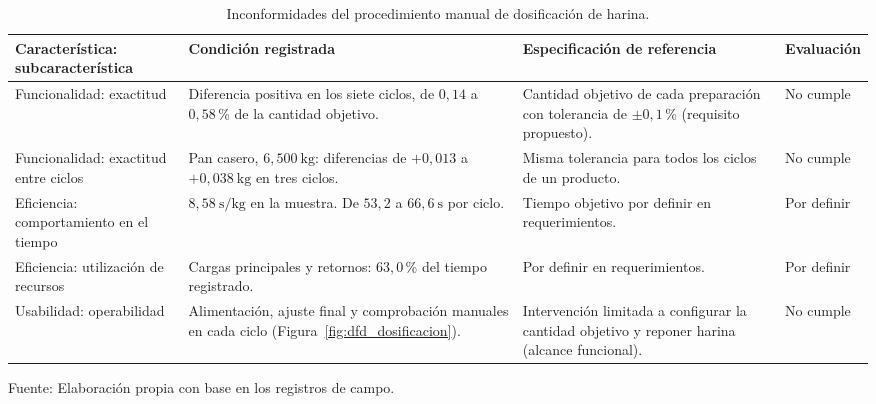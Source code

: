 \begin{table}[H]
    \centering
    \caption{Inconformidades del procedimiento manual de dosificación de
    harina.}
    \label{tab:inconformidades}
    \footnotesize
    \setlength{\tabcolsep}{4pt}
    \renewcommand{\arraystretch}{1.35}

    \begin{tabularx}{\textwidth}{
        >{\raggedright\arraybackslash}p{}
        >{\raggedright\arraybackslash}X
        >{\raggedright\arraybackslash}p{}
        >{\raggedright\arraybackslash}p{}}
        \toprule[1pt]
        \textbf{Característica: subcaracterística} &
        \textbf{Condición registrada} &
        \textbf{Especificación de referencia} &
        \textbf{Evaluación} \\
        \midrule[1pt]

        Funcionalidad: exactitud &
        Diferencia positiva en los siete ciclos, de $0{,}14$ a
        $0{,}58$\,\% de la cantidad objetivo. &
        Cantidad objetivo de cada preparación con tolerancia de
        $\pm 0{,}1$\,\% (requisito propuesto). &
        No cumple \\
        \midrule

        Funcionalidad: exactitud entre ciclos &
        Pan casero, $6{,}500\ \mathrm{kg}$: diferencias de $+0{,}013$ a
        $+0{,}038\ \mathrm{kg}$ en tres ciclos. &
        Misma tolerancia para todos los ciclos de un producto. &
        No cumple \\
        \midrule

        Eficiencia: comportamiento en el tiempo &
        $8{,}58\ \mathrm{s/kg}$ en la muestra. De $53{,}2$ a
        $66{,}6\ \mathrm{s}$ por ciclo. &
        Tiempo objetivo por definir en requerimientos. &
        Por definir \\
        \midrule

        Eficiencia: utilización de recursos &
        Cargas principales y retornos: $63{,}0$\,\% del tiempo registrado. &
        Por definir en requerimientos. &
        Por definir \\
        \midrule

        Usabilidad: operabilidad &
        Alimentación, ajuste final y comprobación manuales en cada ciclo
        (Figura~\ref{fig:dfd_dosificacion}). &
        Intervención limitada a configurar la cantidad objetivo y reponer
        harina (alcance funcional). &
        No cumple \\
        \bottomrule[1pt]
    \end{tabularx}

    \vspace{0.5em}
    {\footnotesize Fuente: Elaboración propia con base en los registros de
    campo.}
\end{table}

